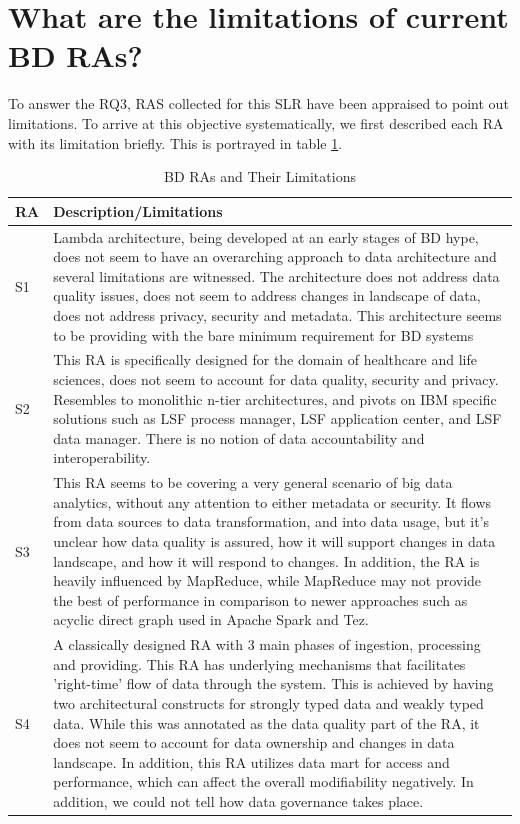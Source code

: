 \documentclass{ieeeaccess}
\begin{document}
\section{What are the limitations of current BD RAs?}

To answer the RQ3, RAS collected for this SLR have been appraised to point out limitations. To arrive at this objective systematically, we first described each RA with its limitation briefly. This is portrayed in table \ref{table:BD-RAs-Limitations}.


\begin{table}
    \caption{BD RAs and Their Limitations}
    \renewcommand*{\arraystretch}{1.4}
    \label{table:BD-RAs-Limitations}
    \begin{tabular}{|p{0.3cm}|p{16.8cm}|}
        \hline
        RA & Description/Limitations \\ 
        \hline
        S1 & Lambda architecture, being developed at an early stages of BD hype, does not seem to have an overarching approach to data architecture and several limitations are witnessed. The architecture does not address data quality issues, does not seem to address changes in landscape of data, does not address privacy, security and metadata. This architecture seems to be providing with the bare minimum requirement for BD systems  \\
        \hline
        S2 & This RA is specifically designed for the domain of healthcare and life sciences, does not seem to account for data quality, security and privacy. Resembles to monolithic n-tier architectures, and pivots on IBM specific solutions such as LSF process manager, LSF application center, and LSF data manager. There is no notion of data accountability and interoperability. \\
        \hline
        S3 & This RA seems to be covering a very general scenario of big data analytics, without any attention to either metadata or security. It flows from data sources to data transformation, and into data usage, but it's unclear how data quality is assured, how it will support changes in data landscape, and how it will respond to changes. In addition, the RA is heavily influenced by MapReduce, while MapReduce may not provide the best of performance in comparison to newer approaches such as acyclic direct graph used in Apache Spark and Tez.  \\
        \hline
        S4 & A classically designed RA with 3 main phases of ingestion, processing and providing. This RA has underlying mechanisms that facilitates 'right-time' flow of data through the system. This is achieved by having two architectural constructs for strongly typed data and weakly typed data. While this was annotated as the data quality part of the RA, it does not seem to account for data ownership and changes in data landscape. In addition, this RA utilizes data mart for access and performance, which can affect the overall modifiability negatively. In addition, we could not tell how data governance takes place.  \\

\end{tabular}
\end{table}
\end{document}
